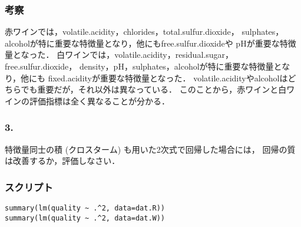 \documentclass{jsarticle}
\begin{document}
\subsubsection*{考察}
赤ワインでは，volatile.acidity，chlorides，total.sulfur.dioxide，
sulphates，alcoholが特に重要な特徴量となり，他にもfree.sulfur.dioxideや
pHが重要な特徴量となった．
白ワインでは，volatile.acidity，residual.sugar，free.sulfur.dioxide，
density，pH，sulphates，alcoholが特に重要な特徴量となり，他にも
fixed.acidityが重要な特徴量となった．
volatile.acidityやalcoholはどちらでも重要だが，それ以外は異なっている．
このことから，赤ワインと白ワインの評価指標は全く異なることが分かる．

\subsubsection*{3.}
特徴量同士の積 (クロスターム) も用いた2次式で回帰した場合には，
回帰の質は改善するか，評価しなさい．

\subsubsection*{スクリプト}
\begin{lstlisting}[basicstyle=\ttfamily\footnotesize, frame=single]
summary(lm(quality ~ .^2, data=dat.R))
summary(lm(quality ~ .^2, data=dat.W))
\end{lstlisting}
\end{document}
